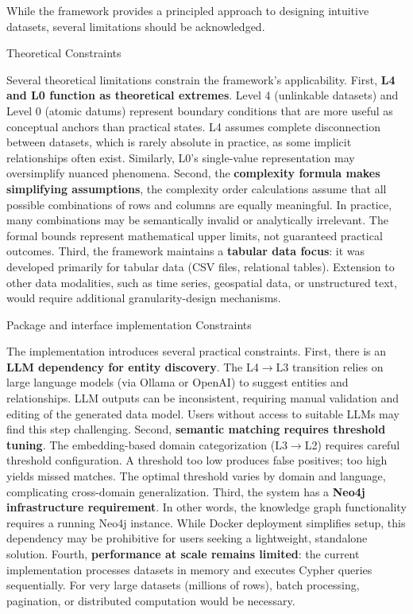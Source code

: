 \documentclass[]{hdsr}
\makeatletter
\def\subsubsection{\@startsection{subsubsection}{3}%
  \z@{.5\linespacing\@plus.7\linespacing}{.5\linespacing}%
  {\normalfont\bfseries}}
\theoremstyle{plain}      %
\theoremstyle{definition} %
\theoremstyle{remark}     %
\makeatother
\begin{document}
While the framework provides a principled approach to designing intuitive datasets, several limitations should be acknowledged.

\subsubsection{Theoretical Constraints}

Several theoretical limitations constrain the framework's applicability. First, \textbf{L4 and L0 function as theoretical extremes}. Level 4 (unlinkable datasets) and Level 0 (atomic datums) represent boundary conditions that are more useful as conceptual anchors than practical states. L4 assumes complete disconnection between datasets, which is rarely absolute in practice, as some implicit relationships often exist. Similarly, L0's single-value representation may oversimplify nuanced phenomena. Second, the \textbf{complexity formula makes simplifying assumptions}, the complexity order calculations assume that all possible combinations of rows and columns are equally meaningful. In practice, many combinations may be semantically invalid or analytically irrelevant. The formal bounds represent mathematical upper limits, not guaranteed practical outcomes. Third, the framework maintains a \textbf{tabular data focus}: it was developed primarily for tabular data (CSV files, relational tables). Extension to other data modalities, such as time series, geospatial data, or unstructured text, would require additional granularity-design mechanisms.

\subsubsection{Package and interface implementation Constraints}

The implementation introduces several practical constraints. First, there is an \textbf{LLM dependency for entity discovery}. The L4$\to$L3 transition relies on large language models (via Ollama or OpenAI) to suggest entities and relationships. LLM outputs can be inconsistent, requiring manual validation and editing of the generated data model. Users without access to suitable LLMs may find this step challenging. Second, \textbf{semantic matching requires threshold tuning}. The embedding-based domain categorization (L3$\to$L2) requires careful threshold configuration. A threshold too low produces false positives; too high yields missed matches. The optimal threshold varies by domain and language, complicating cross-domain generalization. Third, the system has a \textbf{Neo4j infrastructure requirement}. In other words, the knowledge graph functionality requires a running Neo4j instance. While Docker deployment simplifies setup, this dependency may be prohibitive for users seeking a lightweight, standalone solution. Fourth, \textbf{performance at scale remains limited}: the current implementation processes datasets in memory and executes Cypher queries sequentially. For very large datasets (millions of rows), batch processing, pagination, or distributed computation would be necessary.
\end{document}
